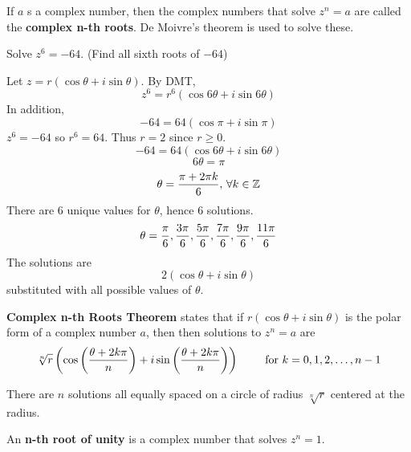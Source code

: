 \documentclass[english, 12pt]{article}
\begin{document}
\begin{defn}
If $a$ s a complex number, then the complex numbers that solve $z^n=a$ are called the \textbf{complex n-th roots}. De Moivre's theorem is used to solve these.
\end{defn}
\begin{exmp}
Solve $z^6 = -64$. (Find all sixth roots of $-64$)
\begin{sol}
Let $z = r (\cos \theta + i \sin \theta)$. By DMT,
\[ z^6 = r^6 (\cos 6\theta + i \sin 6\theta)\]
In addition,
\[ -64 = 64 (\cos \pi + i \sin \pi)\]
$z^6 = -64$ so $r^6 = 64$. Thus $r = 2$ since $r \geq 0$.
\[-64 = 64(\cos 6\theta + i \sin 6 \theta)\]
\[ 6 \theta = \pi\]
\[ \theta = \frac{\pi + 2 \pi k}{6}, \, \forall k \in {\mathbb{Z}}\]
There are $6$ unique values for $\theta$, hence $6$ solutions.
\[ \theta = \frac{\pi}{6}, \frac{3\pi}{6},\frac{5\pi}{6},\frac{7\pi}{6},\frac{9\pi}{6},\frac{11\pi}{6}\]
The solutions are 
\[ 2 (\cos \theta + i \sin \theta)\]
substituted with all possible values of $\theta$.
\end{sol}
\end{exmp}
\begin{thrm}[CNRT]
\textbf{Complex n-th Roots Theorem} states that if $r (\cos \theta + i \sin \theta)$ is the polar form of a complex number $a$, then then solutions to $z^n = a$ are
\[\sqrt[n]{r} \left(\cos \left(\frac{\theta + 2k\pi}{n}\right) + i \sin \left(\frac{\theta + 2k\pi}{n}\right)\right) \qquad \text{ for } k = 0,1,2,\dots,n-1\]
\begin{note}
There are $n$ solutions all equally spaced on a circle of radius $\sqrt[n]{r}$ centered at the radius.
\end{note}
\end{thrm}
\begin{defn}
An \textbf{n-th root of unity} is a complex number that solves $z^n=1$.
\end{defn}
\end{document}

